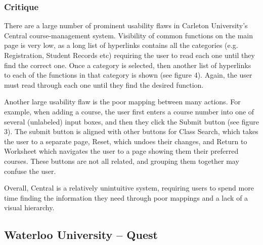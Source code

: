 \documentclass[10pt]{article}
\newenvironment{InlineColumnFigure}
{\par\medskip\noindent\minipage{\linewidth}}
{\endminipage\par\medskip}
\newcommand{\Caption}[1]
{\vspace{-4mm}\fontsize{9}{9}\textbf{Figure \refstepcounter{figCounter} 
\arabic{figCounter}: #1}}
\newcounter{figCounter}
\begin{document}
\begin{multicols}{2}

\subsubsection*{Critique}
There are a large number of prominent usability flaws in Carleton University's 
Central course-management system. Visibility of common functions on the main 
page is very low, as a long list of hyperlinks contains all the categories (e.g. 
Registration, Student Records etc) requiring the user to read each one until 
they find the correct one. Once a category is selected, then another list of 
hyperlinks to each of the functions in that category is shown (see figure 4). 
Again, the user must read through each one until they find the desired function.



Another large usability flaw is the poor mapping between many actions. For 
example, when adding a course, the user first enters a course number into one of 
several (unlabeled) input boxes, and then they click the Submit button (see 
figure 3). The submit button is aligned with other buttons for Class Search, 
which takes the user to a separate page, Reset, which undoes their changes, and 
Return to Worksheet which navigates the user to a page showing them their 
preferred courses. These buttons are not all related, and grouping them together 
may confuse the user.

Overall, Central is a relatively unintuitive system, requiring users to spend 
more time finding the information they need through poor mappings and a lack of 
a visual hierarchy.

\subsection*{Waterloo University -- Quest}

\end{multicols}
\end{document}
